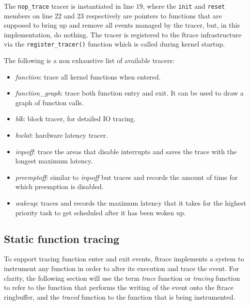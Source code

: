 The \verb|nop_trace| tracer is instantiated in line $19$, where the \verb|init|
and \verb|reset| members on line $22$ and $23$ respectively are pointers to
functions that are supposed to bring up and remove all events managed by the
tracer, but, in this implementation, do nothing. The tracer is registered to the
ftrace infrastructure via the \verb|register_tracer()| function which is called
during kernel startup.

The following is a non exhaustive list of available tracers:

\begin{itemize}

\item \textit{function}: trace all kernel functions when entered.

\item \textit{function\_graph}: trace both function entry and exit. It can be
used to draw a graph of function calls.

\item \textit{blk}: block tracer, for detailed IO tracing.

\item \textit{hwlat}: hardware latency tracer.

\item \textit{irqsoff}: trace the areas that disable interrupts and saves the
trace with the longest maximum latency.

\item \textit{preemptoff}: similar to \textit{irqsoff} but traces and records
the amount of time for which preemption is disabled.

\item \textit{wakeup}: traces and records the maximum latency that it takes for
the highest priority task to get scheduled after it has been woken up.

\end{itemize}

\subsection{Static function tracing}

To support tracing function enter and exit events, ftrace implements a system to
instrument any function in order to alter its execution and trace the event. For
clarity, the following section will use the term \textit{trace} function or
\textit{tracing} function to refer to the function that performs the writing of
the event onto the ftrace ringbuffer, and the \textit{traced} function to the
function that is being instrumented.

